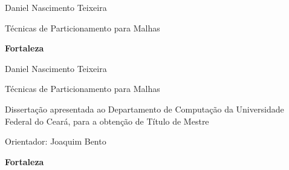 \pagestyle{empty}

\begin{titlepage}


\begin{center}
{\LARGE Daniel Nascimento Teixeira}
\par
\vspace{200pt}
{\Huge Técnicas de Particionamento para Malhas}
\par
\vfill
\textbf{{\large Fortaleza}\\
{\large \the\year}}
\end{center}
\end{titlepage}

\cleardoublepage

\pagestyle{fancy}



\thispagestyle{empty}

\begin{center}
{\LARGE Daniel Nascimento Teixeira}
\par
\vspace{200pt}
{\Huge Técnicas de Particionamento para Malhas}
\end{center}
\par
\vspace{90pt}
\hspace*{175pt}\parbox{7.6cm}{{\large Dissertação apresentada ao Departamento de Computação da Universidade Federal do Ceará, para a obtenção de Título de Mestre}}

\par
\vspace{1em}
\hspace*{175pt}\parbox{7.6cm}{{\large Orientador: Joaquim Bento}}

\par
\vfill
\begin{center}
\textbf{{\large Fortaleza}\\
{\large \the\year}}
\end{center}

